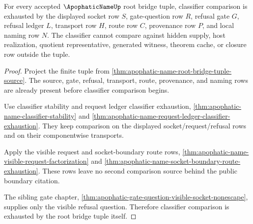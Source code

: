 \begin{theorem}
\label{thm:apophatic-name-root-bridge-tuple-classifier}
For every accepted $\ApophaticNameUp$ root bridge tuple, classifier comparison is exhausted by the displayed socket row $S$, gate-question row $R$, refusal gate $G$, refusal ledger $L$, transport row $H$, route row $C$, provenance row $P$, and local naming row $N$. The classifier cannot compare against hidden supply, host realization, quotient representative, generated witness, theorem cache, or closure row outside the tuple.
\end{theorem}
\begin{proof}
Project the finite tuple from \autoref{thm:apophatic-name-root-bridge-tuple-source}. The source, gate, refusal, transport, route, provenance, and naming rows are already present before classifier comparison begins.

Use classifier stability and request ledger classifier exhaustion, \autoref{thm:apophatic-name-classifier-stability} and \autoref{thm:apophatic-name-request-ledger-classifier-exhaustion}. They keep comparison on the displayed socket/request/refusal rows and on their componentwise transports.

Apply the visible request and socket-boundary route rows, \autoref{thm:apophatic-name-visible-request-factorization} and \autoref{thm:apophatic-name-socket-boundary-route-exhaustion}. These rows leave no second comparison source behind the public boundary citation.

The sibling gate chapter, \autoref{thm:apophatic-gate-question-visible-socket-nonescape}, supplies only the visible refusal question. Therefore classifier comparison is exhausted by the root bridge tuple itself.
\end{proof}

